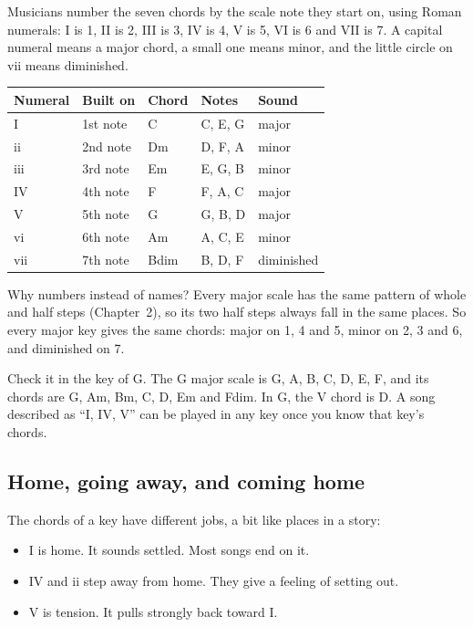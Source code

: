 Musicians number the seven chords by the scale note they start on, using Roman numerals: I is 1, II is 2, III is 3, IV is 4, V is 5, VI is 6 and VII is 7. A capital numeral means a major chord, a small one means minor, and the little circle on vii\textdegree{} means diminished.

\begin{center}
\begin{tabular}{lllll}
\toprule
Numeral & Built on & Chord & Notes & Sound \\
\midrule
I & 1st note & C & C, E, G & major \\
ii & 2nd note & Dm & D, F, A & minor \\
iii & 3rd note & Em & E, G, B & minor \\
IV & 4th note & F & F, A, C & major \\
V & 5th note & G & G, B, D & major \\
vi & 6th note & Am & A, C, E & minor \\
vii\textdegree{} & 7th note & Bdim & B, D, F & diminished \\
\bottomrule
\end{tabular}
\end{center}

Why numbers instead of names? Every major scale has the same pattern of whole and half steps (Chapter~2), so its two half steps always fall in the same places. So every major key gives the same chords: major on 1, 4 and 5, minor on 2, 3 and 6, and diminished on 7.

Check it in the key of G. The G major scale is G, A, B, C, D, E, F\sh, and its chords are G, Am, Bm, C, D, Em and F\sh{}dim.  In G, the V chord is D. A song described as ``I, IV, V'' can be played in any key once you know that key's chords.

\subsection*{Home, going away, and coming home}

The chords of a key have different jobs, a bit like places in a story:
\begin{itemize}
  \item I is home. It sounds settled. Most songs end on it.
  \item IV and ii step away from home. They give a feeling of setting out.
  \item V is tension. It pulls strongly back toward I.
\end{itemize}

